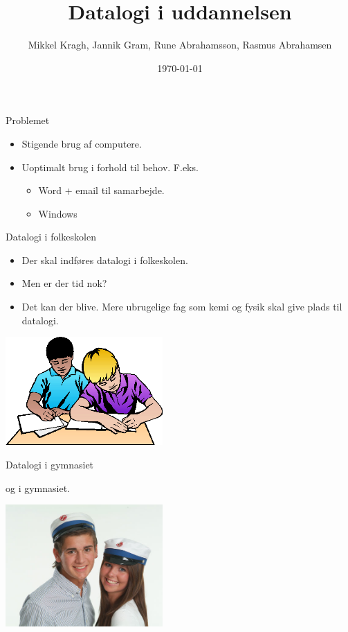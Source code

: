 \documentclass{beamer}
\title[Datalogi i uddannelsen]{Datalogi i uddannelsen}
\author{Mikkel Kragh, Jannik Gram, Rune Abrahamsson, Rasmus Abrahamsen}
\institute{DIKU}
\date{\today}
\begin{document}
\begin{frame}
\titlepage
\end{frame}


\begin{frame}{Problemet}
\begin{itemize}
\item Stigende brug af computere.
\item Uoptimalt brug i forhold til behov. F.eks.
\begin{itemize}
\item Word + email til samarbejde.
\item Windows
\end{itemize}
\end{itemize}

\end{frame}

\begin{frame}{Datalogi i folkeskolen}

\begin{itemize}
\item Der skal indføres datalogi i folkeskolen.
\item Men er der tid nok?
\item Det kan der blive. Mere ubrugelige fag som kemi og fysik skal give plads til datalogi.
\end{itemize}

\includegraphics[width=60mm]{skole.png}

\end{frame}

\begin{frame}{Datalogi i gymnasiet}

og i gymnasiet.

\includegraphics[width=60mm]{gymnasie.png}

\end{frame}
\end{document}
